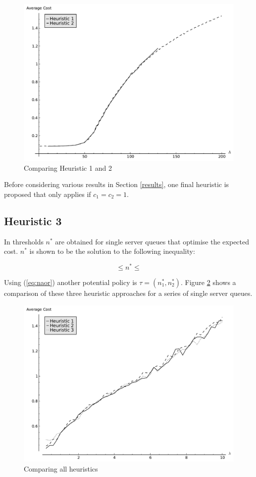 \documentclass[12pt]{article}
\begin{document}
\begin{figure}[!hbtp]
    \begin{center}
        \includegraphics[width=.6\textwidth]{Images/CaseStudyComp.pdf}
    \end{center}
    \caption{Comparing Heuristic 1 and 2}\label{casestudycomp}
\end{figure}

Before considering various results in Section \ref{results}, one final heuristic is proposed that only applies if $c_1=c_2=1$.

\subsection{Heuristic 3}\label{heuristic3}

In \cite{Naor} thresholds $n^*$ are obtained for single server queues that optimise the expected cost. $n^*$ is shown to be the solution to the following inequality:

\begin{equation}\label{eq:naor}
  \leq  n ^ * \leq
\end{equation}

Using (\ref{eq:naor}) another potential policy is $\tau = (n^*_1, n^*_2)$.
Figure \ref{allheuristics} shows a comparison of these three heuristic approaches for a series of single server queues.

\begin{figure}[!hbtp]
    \begin{center}
        \includegraphics[width=.6\textwidth]{Images/Exit0.pdf}
    \end{center}
    \caption{Comparing all heuristics}\label{allheuristics}
\end{figure}
\end{document}
